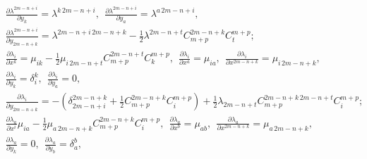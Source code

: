\begin{gather*}
%


{\frac{\partial\lambda^{2m-n+i}}{\partial y_k}=\lambda^{k\,


2m-n+i},\ \


\frac{\partial\lambda^{2m-n+i}}{\partial y_a}=\lambda^{a\, 2m-n+i},}\\


%


{\frac{\partial\lambda^{2m-n+i}}{\partial y_{2m-


n+k}}=\lambda^{2m-n+i\, 2m-n+k}-\frac{1}{2} \lambda^{2m-n+t}C^{2m-


n+k}_{m+p}C^{m+p}_t ;}\\


%


{\frac{\partial\lambda_i}{\partial x^k}=\mu_{ik}-


\frac{1}{2}\mu_{i\, 2m-n+t}C^{2m-n+t}_{m+p}C^{m+p}_k,\ \ \frac{\partial


\lambda_i}{\partial x^a}=\mu_{ia},\ \ \frac{\partial\lambda_i}{\partial


x^{2m-n+k}}=\mu_{i\, 2m-n+k},}\\


%


{\frac{\partial\lambda_i}{\partial y_k}=\delta^k_i,\ \


\frac{\partial\lambda_i}{\partial y_a}=0, }\\


%


{\frac{\partial\lambda_i}{\partial y_{2m-n+k}}=-


\left(\delta_{2m-n+i}^{2m-n+k} +\frac{1}{2}C^{2m-


n+k}_{m+p}C_i^{m+p}\right)+\frac{1}{2}\lambda_{2m-n+t}C^{2m-n+k\, 2m-


n+t}_{m+p}C^{m+p}_i ;}\\


%


{\frac{\partial\lambda_a}{\partial x^i}\mu_{ia}-


\frac{1}{2}\mu_{a\, 2m-n+k}C^{2m-n+k}_{m+p}C^{m+p}_i,\ \


\frac{\partial\lambda_a}{\partial x^b}=\mu_{ab},\ \


\frac{\partial\lambda_a}{\partial x^{2m-n+k}}=\mu_{a\, 2m-n+k},}\\


%


{\frac{\partial\lambda_a}{\partial y_k}=0,\ \


\frac{\partial\lambda_a}{\partial y_b}=\delta^b_a,\ \


}
\end{gather*}
